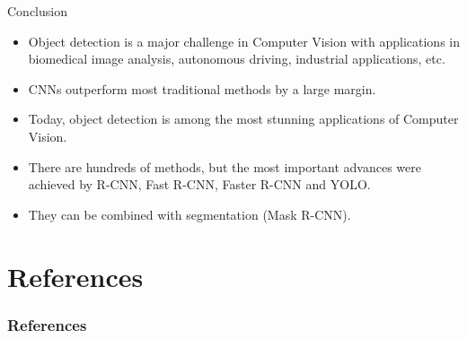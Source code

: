 \documentclass[xcolor=pdftex,dvipsnames,table]{beamer}
\begin{document}
\begin{frame}{Conclusion}
\begin{itemize}
\item Object detection is a major challenge in Computer Vision with applications in biomedical image analysis, autonomous driving, industrial applications, etc.
\item CNNs outperform most traditional methods by a large margin. 
\item Today, object detection is among the most stunning applications of Computer Vision. 
\item There are hundreds of methods, but the most important advances were achieved by R-CNN, Fast R-CNN, Faster R-CNN and YOLO. 
\item They can be combined with segmentation (Mask R-CNN). 
\end{itemize}
\end{frame}



\section{References}
\begin{frame}[allowframebreaks]
	\frametitle{References}
	
\end{frame}
\end{document}
